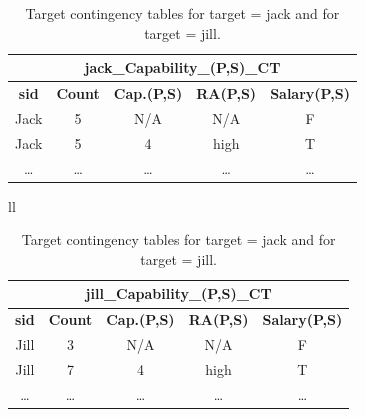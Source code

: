 \begin{table}[htbp] 
\centering
\caption{Target contingency tables for target = jack and for target = jill.}

  \begin{tabular}{|c|c|c|c|c|} 
    \multicolumn{5}{c}{jack\_Capability\_(P,S)\_CT} \\  \hline
    \textbf{sid}   & \textbf{Count} &\textbf{ Cap.(P,S)} & \textbf{RA(P,S)} & \textbf{Salary(P,S)} \\  \hline
    Jack  & 5     & N/A   & N/A   & F \\ \hline
    Jack  & 5     & 4     & high  & T \\ \hline
    \dots    &  \dots      &  \dots     & \dots      & \dots   \\ \hline
    \end{tabular}%

\bigskip

\begin{tabular}{ll}
  \begin{tabular}{|c|c|c|c|c|} 
    \multicolumn{5}{c}{jill\_Capability\_(P,S)\_CT} \\  \hline
    \textbf{sid}   & \textbf{Count} &\textbf{ Cap.(P,S)} & \textbf{RA(P,S)} & \textbf{Salary(P,S)} \\  \hline
    Jill  & 3     & N/A   & N/A   & F \\ \hline
    Jill  & 7     & 4     & high  & T \\ \hline
    \dots    &  \dots      &  \dots     & \dots      & \dots   \\ \hline
    \end{tabular}%
\end{tabular}

 \label{table:targetct}
\end{table}




